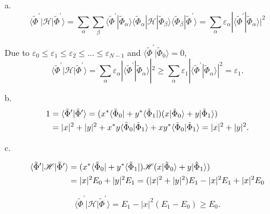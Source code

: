 \documentclass[a4paper]{book}
\newcounter{solution}[chapter]
\newcounter{eqs}[solution]
\begin{document}
	\begin{solution}
	\begin{enumerate}
	\item[a.]
	\begin{equation*}
		\langle \tilde{\Phi}^\prime | \mathscr{H} | \tilde{\Phi}^\prime \rangle = \sum_\alpha \sum_\beta \langle \tilde{\Phi}^\prime | \tilde{\Phi}_\alpha \rangle \langle \tilde{\Phi}_\alpha |\mathscr{H} | \tilde{\Phi}_\beta \rangle \langle \tilde{\Phi}_\beta | \tilde{\Phi}^\prime \rangle = \sum_\alpha \varepsilon_\alpha | \langle \tilde{\Phi}^\prime | \tilde{\Phi}_\alpha \rangle |^2
	\end{equation*}
	
	Due to $\varepsilon_0 \leqslant \varepsilon_1 \leqslant \varepsilon_2 \leqslant ... \leqslant \varepsilon_{N - 1}$ and $\langle \tilde{\Phi}^\prime | \tilde{\Phi}_0 \rangle = 0$,
	\begin{equation}
		\langle \tilde{\Phi}^\prime | \mathscr{H} | \tilde{\Phi}^\prime \rangle = \sum_\alpha \varepsilon_\alpha | \langle \tilde{\Phi}^\prime | \tilde{\Phi}_\alpha \rangle |^2 \geqslant \sum_\alpha \varepsilon_1 | \langle \tilde{\Phi}^\prime | \tilde{\Phi}_\alpha \rangle |^2 = \varepsilon_1.
	\end{equation}
			
	\item[b.]
	\begin{align}
		1 &= \langle \tilde{\Phi}^\prime | \tilde{\Phi}^\prime \rangle = ( x^* \langle \tilde{\Phi}_0 | + y^* \langle \tilde{\Phi}_1 | ) ( x | \tilde{\Phi}_0 \rangle + y | \tilde{\Phi}_1 \rangle ) \notag \\
		&= |x|^2 + |y|^2 + x^*y \langle \tilde{\Phi}_0 | \tilde{\Phi}_1 \rangle +  xy^* \langle \tilde{\Phi}_0 | \tilde{\Phi}_1 \rangle = |x|^2 + |y|^2.
	\end{align}
				
	\item[c.]
	
	\begin{align*}
		\langle \tilde{\Phi}^\prime | \mathscr{H} | \tilde{\Phi}^\prime \rangle &= ( x^* \langle \tilde{\Phi}_0 | + y^* \langle \tilde{\Phi}_1 | ) \mathscr{H} ( x | \tilde{\Phi}_0 \rangle + y | \tilde{\Phi}_1 \rangle ) \notag \\
		&= |x|^2 E_0 + |y|^2 E_1 = ( |x|^2 + |y|^2 ) E_1 - |x|^2 E_1 + |x|^2 E_0
	\end{align*}
				
	\begin{equation}
		\langle \tilde{\Phi}^\prime | \mathscr{H} | \tilde{\Phi}^\prime \rangle = E_1 - |x|^2 ( E_1 - E_0 ) \geqslant E_0. 
	\end{equation}
	
	\end{enumerate}
			
	\end{solution}
	
\end{document}
